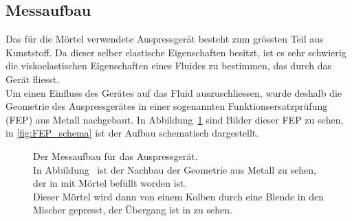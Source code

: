 \subsection{Messaufbau}
Das für die Mörtel verwendete Auspressgerät besteht zum grössten Teil aus Kunststoff. Da dieser selber elastische Eigenschaften besitzt, ist es sehr schwierig die viskoelastischen Eigenschaften eines Fluides zu bestimmen, das durch das Gerät fliesst.\\
Um einen Einfluss des Gerätes auf das Fluid auszuschliessen, wurde deshalb die Geometrie des Auspressgerätes in einer sogenannten Funktionsersatzprüfung (FEP) aus Metall nachgebaut. In Abbildung~\ref{fig:FEP} sind Bilder dieser FEP zu sehen, in \ref{fig:FEP_schema} ist der Aufbau schematisch dargestellt.
%
\begin{figure}
    \centering
    \caption{Der Messaufbau für das Auspressgerät.\\In Abbildung~ ist der Nachbau der Geometrie aus Metall zu sehen, der in  mit Mörtel befüllt worden ist.\\
    Dieser Mörtel wird dann von einem Kolben durch eine Blende in den Mischer gepresst, der Übergang ist in  zu sehen.}
    \label{fig:FEP}
\end{figure}
